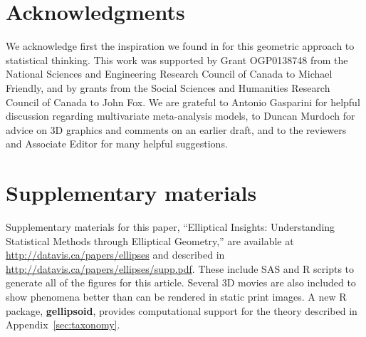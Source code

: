 \documentclass[11pt]{article}%
\newcommand*{\appref}[1]{Appendix~\ref{#1}}
\newcommand*{\pkg}[1]{\textbf{#1}}     %
\begin{document}
\section{Acknowledgments}

We acknowledge first the inspiration we found in \citet{Dempster:69} for this geometric approach to statistical thinking.
This work was supported by Grant OGP0138748 from the National Sciences and Engineering Research Council of Canada to Michael Friendly,
and by grants from the Social Sciences and Humanities Research Council of Canada to John Fox.
We are grateful to Antonio Gasparini for helpful discussion regarding multivariate meta-analysis models, to Duncan Murdoch for 
advice on 3D graphics and comments on an earlier draft, and to the reviewers and Associate Editor for many helpful suggestions.

\section{Supplementary materials}

Supplementary materials for this paper, ``Elliptical Insights: Understanding  Statistical Methods through Elliptical Geometry,''
are available at \url{http://datavis.ca/papers/ellipses} and described in \url{http://datavis.ca/papers/ellipses/supp.pdf}.
These include SAS and R scripts to generate all of the figures for this article.
Several 3D movies are also included to show phenomena better than can be rendered in static print images.
A new R package, \pkg{gellipsoid}, provides computational support for the theory described in \appref{sec:taxonomy}.



{\itemsep -6pt
 \setlength{\bibsep}{2pt}
%
}

\end{document}
